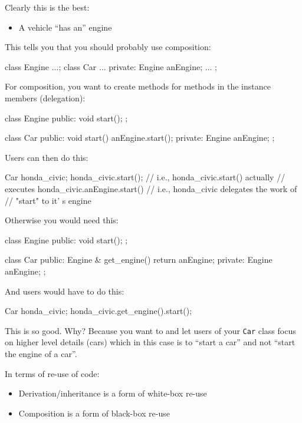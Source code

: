 Clearly this is the best:
\begin{itemize}
\item
  A vehicle ``has an'' engine
\end{itemize}

This tells you that you should probably use composition:
\begin{console}
class Engine {...};
class Car {
...
private:
        Engine anEngine;
        ...
};
\end{console}

For composition, you want to create methods for methods in the instance
members (delegation):
\begin{console}
class Engine {
public:
        void start();
};

class Car {
public:
        void start() { anEngine.start(); }
private:
        Engine anEngine;
};
\end{console}

Users can then do this:
\begin{console}
Car honda_civic;
honda_civic.start();
// i.e., honda_civic.start() actually
// executes honda_civic.anEngine.start()
// i.e., honda_civic delegates the work of
// "start" to it' s engine
\end{console}

Otherwise you would need this:
\begin{console}
class Engine {
public:
        void start();
};

class Car {
public:
        Engine & get_engine() { return anEngine; }
private:
        Engine anEngine;
};
\end{console}

And users would have to do this:
\begin{console}
Car honda_civic;
honda_civic.get_engine().start();
\end{console}

This is  so good. Why? Because you want to  and let users of your \verb!Car! class focus on higher level details (cars) which in this case is to ``start a car'' and not ``start the engine of a car''.

In terms of re-use of code:
\begin{itemize}
\item
  Derivation/inheritance is a form of white-box re-use
\item
  Composition is a form of black-box re-use
\end{itemize}

